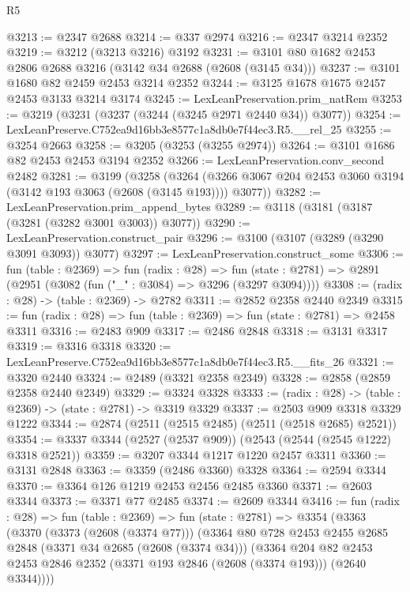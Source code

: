 \begin{lexlean}{R5}
\begin{coremodule}
@3213 := @2347 @2688
@3214 := @337 @2974
@3216 := @2347 @3214 @2352
@3219 := @3212 (@3213 @3216) @3192
@3231 := @3101 @80 @1682 @2453 @2806 @2688 @3216 (@3142 @34 @2688 (@2608 (@3145 @34)))
@3237 := @3101 @1680 @82 @2459 @2453 @3214 @2352
@3244 := @3125 @1678 @1675 @2457 @2453 @3133 @3214 @3174
@3245 := LexLeanPreservation.prim_natRem
@3253 := @3219 (@3231 (@3237 (@3244 (@3245 @2971 @2440 @34)) @3077))
@3254 := LexLeanPreserve.C752ea9d16bb3e8577c1a8db0e7f44ec3.R5.__rel_25
@3255 := @3254 @2663
@3258 := @3205 (@3253 (@3255 @2974))
@3264 := @3101 @1686 @82 @2453 @2453 @3194 @2352
@3266 := LexLeanPreservation.conv_second @2482
@3281 := @3199
    (@3258
      (@3264 (@3266 @3067 @204 @2453 @3060 @3194 (@3142 @193 @3063 (@2608 (@3145 @193)))) @3077))
@3282 := LexLeanPreservation.prim_append_bytes
@3289 := @3118 (@3181 (@3187 (@3281 (@3282 @3001 @3003)) @3077))
@3290 := LexLeanPreservation.construct_pair
@3296 := @3100 (@3107 (@3289 (@3290 @3091 @3093)) @3077)
@3297 := LexLeanPreservation.construct_some
@3306 := fun (table : @2369) =>
  fun (radix : @28) =>
  fun (state : @2781) => @2891 (@2951 (@3082 (fun ("_" : @3084) => @3296 (@3297 @3094))))
@3308 := (radix : @28) -> (table : @2369) -> @2782
@3311 := @2852 @2358 @2440 @2349
@3315 := fun (radix : @28) => fun (table : @2369) => fun (state : @2781) => @2458 @3311
@3316 := @2483 @909
@3317 := @2486 @2848
@3318 := @3131 @3317
@3319 := @3316 @3318
@3320 := LexLeanPreserve.C752ea9d16bb3e8577c1a8db0e7f44ec3.R5.__fits_26
@3321 := @3320 @2440
@3324 := @2489 (@3321 @2358 @2349)
@3328 := @2858 (@2859 @2358 @2440 @2349)
@3329 := @3324 @3328
@3333 := (radix : @28) -> (table : @2369) -> (state : @2781) -> @3319 @3329
@3337 := @2503 @909 @3318 @3329 @1222
@3344 := @2874 (@2511 (@2515 @2485) (@2511 (@2518 @2685) @2521))
@3354 := @3337 @3344 (@2527 (@2537 @909)) (@2543 (@2544 (@2545 @1222) @3318 @2521))
@3359 := @3207 @3344 @1217 @1220 @2457 @3311
@3360 := @3131 @2848
@3363 := @3359 (@2486 @3360) @3328
@3364 := @2594 @3344
@3370 := @3364 @126 @1219 @2453 @2456 @2485 @3360
@3371 := @2603 @3344
@3373 := @3371 @77 @2485
@3374 := @2609 @3344
@3416 := fun (radix : @28) =>
  fun (table : @2369) =>
  fun (state : @2781) =>
  @3354
    (@3363
      (@3370
        (@3373 (@2608 (@3374 @77)))
        (@3364
          @80
          @728
          @2453
          @2455
          @2685
          @2848
          (@3371 @34 @2685 (@2608 (@3374 @34)))
          (@3364
            @204
            @82
            @2453
            @2453
            @2846
            @2352
            (@3371 @193 @2846 (@2608 (@3374 @193)))
            (@2640 @3344))))

\end{coremodule}
\end{lexlean}
